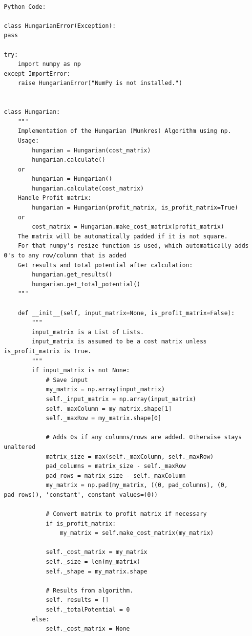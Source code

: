 \documentclass[12pt, letterpaper, twoside]{book}
\begin{document}
\begin{lstlisting}

Python Code:
	
class HungarianError(Exception):
pass

try:
    import numpy as np
except ImportError:
    raise HungarianError("NumPy is not installed.")


class Hungarian:
    """
    Implementation of the Hungarian (Munkres) Algorithm using np.
    Usage:
        hungarian = Hungarian(cost_matrix)
        hungarian.calculate()
    or
        hungarian = Hungarian()
        hungarian.calculate(cost_matrix)
    Handle Profit matrix:
        hungarian = Hungarian(profit_matrix, is_profit_matrix=True)
    or
        cost_matrix = Hungarian.make_cost_matrix(profit_matrix)
    The matrix will be automatically padded if it is not square.
    For that numpy's resize function is used, which automatically adds 0's to any row/column that is added
    Get results and total potential after calculation:
        hungarian.get_results()
        hungarian.get_total_potential()
    """

    def __init__(self, input_matrix=None, is_profit_matrix=False):
        """
        input_matrix is a List of Lists.
        input_matrix is assumed to be a cost matrix unless is_profit_matrix is True.
        """
        if input_matrix is not None:
            # Save input
            my_matrix = np.array(input_matrix)
            self._input_matrix = np.array(input_matrix)
            self._maxColumn = my_matrix.shape[1]
            self._maxRow = my_matrix.shape[0]

            # Adds 0s if any columns/rows are added. Otherwise stays unaltered
            matrix_size = max(self._maxColumn, self._maxRow)
            pad_columns = matrix_size - self._maxRow
            pad_rows = matrix_size - self._maxColumn
            my_matrix = np.pad(my_matrix, ((0, pad_columns), (0, pad_rows)), 'constant', constant_values=(0))

            # Convert matrix to profit matrix if necessary
            if is_profit_matrix:
                my_matrix = self.make_cost_matrix(my_matrix)

            self._cost_matrix = my_matrix
            self._size = len(my_matrix)
            self._shape = my_matrix.shape

            # Results from algorithm.
            self._results = []
            self._totalPotential = 0
        else:
            self._cost_matrix = None


\end{lstlisting}
\end{document}
